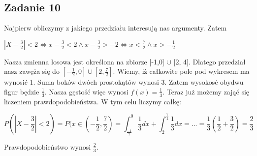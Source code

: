 \subsection{Zadanie 10}

Najpierw obliczymy z jakiego przedziału interesują nas argumenty. Zatem

\begin{center} 
	$|X - \frac{3}{2}| < 2 \iff 
	x-\frac{3}{2} < 2 \land x-\frac{3}{2} > -2 \iff  x < \frac{7}{2} \land x> -\frac{1}{2} $	
\end{center}

Nasza zmienna losowa jest określona na zbiorze [-1,0] $\cup$ [2, 4].
Dlatego przedział nasz zawęża się do  $[-\frac{1}{2}, 0] \cup [2, \frac{7}{2}]$.
Wiemy, iż całkowite pole pod wykresem ma wynosić 1.
Suma boków dwóch prostokątów wynosi 3. Zatem wysokosć obydwu figur będzie $\frac{1}{3}$.
Nasza gęstość więc wynosi $ f(x) = \frac{1}{3}$.
Teraz już możemy zająć się liczeniem prawdopodobieństwa.
W tym celu liczymy całkę:

\begin{center}
	$$ P(|X - \frac{3}{2}| < 2) = P(x \in (-\frac{1}{2},\frac{7}{2}) = \int_{\frac{-1}{2}}^{0} \frac{1}{3} dx  + \int_{2}^{\frac{7}{2}}\frac{1}{3} dx = ... = \frac{1}{3}(\frac{1}{2} + \frac{3}{2}) = \frac{2}{3}$$
\end{center}

Prawdopodobieństwo wynosi $\frac{2}{3}$.
